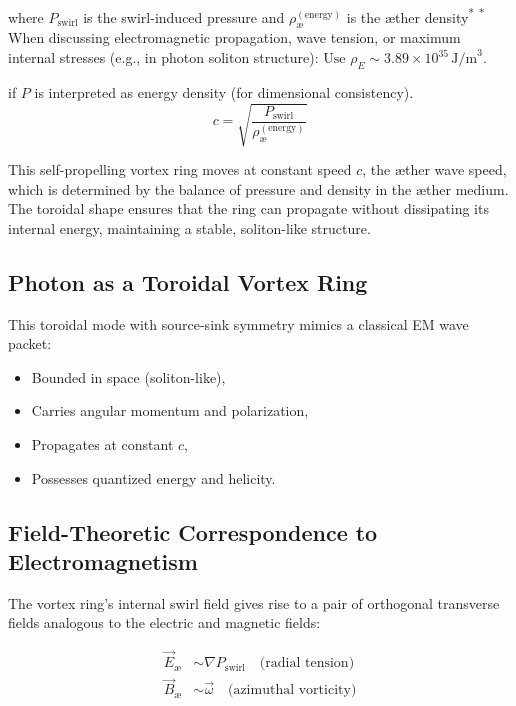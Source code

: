 \documentclass[preprint]{revtex4-2}
\begin{document}
\noindent
where $P_{\text{swirl}}$ is the swirl-induced pressure and $\rho_\text{\ae}^{(\text{energy})}$ is the æther density\textsuperscript{*}
\vspace{0.5em}
\noindent\textsuperscript{*}\small
When discussing electromagnetic propagation, wave tension, or maximum internal stresses (e.g., in photon soliton structure): $\text{Use } \rho_{\scriptscriptstyle\boldsymbol\!E}\sim 3.89 \times 10^{35} \, \text{J/m}^3$.


if $P$ is interpreted as energy density (for dimensional consistency).
\begin{equation}
    c = \sqrt{\frac{P_{\text{swirl}}}{\rho_\text{\ae}^{(\text{energy})}}}
\end{equation}

This self-propelling vortex ring moves at constant speed $c$, the æther wave speed, which is determined by the balance of pressure and density in the æther medium. The toroidal shape ensures that the ring can propagate without dissipating its internal energy, maintaining a stable, soliton-like structure.

\subsection{Photon as a Toroidal Vortex Ring}
This toroidal mode with source-sink symmetry mimics a classical EM wave packet:
\begin{itemize}
    \item Bounded in space (soliton-like),
    \item Carries angular momentum and polarization,
    \item Propagates at constant \( c \),
    \item Possesses quantized energy and helicity.
\end{itemize}


\subsection{Field-Theoretic Correspondence to Electromagnetism}

The vortex ring’s internal swirl field gives rise to a pair of orthogonal transverse fields analogous to the electric and magnetic fields:

\begin{align}
    \vec{E}_\text{æ} &\sim \nabla P_{\text{swirl}} \quad \text{(radial tension)} \\
    \vec{B}_\text{æ} &\sim \vec{\omega} \quad \text{(azimuthal vorticity)}
\end{align}
\end{document}
